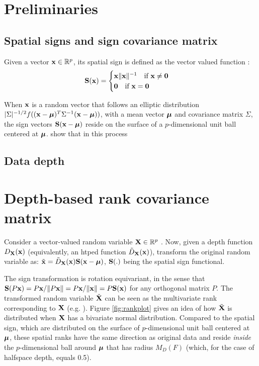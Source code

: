 \documentclass[fleqn,12pt]{article}
\begin{document}
\section{Preliminaries}
\subsection{Spatial signs and sign covariance matrix}
Given a vector ${\bf{x}} \in \mathbb{R}^p$, its spatial sign is defined as the vector valued function \citep{locantore99}:
$$ {\mathbf{S}}({\bf{x}}) = \begin{cases} {\bf{x}}\| {\bf{x}} \|^{-1} \quad \mbox{if }{\bf{x}} \neq \bf0\\
\bf0 \quad \mbox{if }{\bf{x}} = \bf0 \end{cases} $$

When ${\bf{x}}$ is a random vector that follows an elliptic distribution $|\Sigma|^{-1/2} f(({\bf{x}} - {\boldsymbol{\mu}})^T \Sigma^{-1} ({\bf{x}} - {\boldsymbol{\mu}}))$, with a mean vector ${\boldsymbol{\mu}}$ and covariance matrix $\Sigma$, the sign vectors ${\mathbf{S}}({\bf{x}} - {\boldsymbol{\mu}})$ reside on the surface of a $p$-dimensional unit ball centered at ${\boldsymbol{\mu}}$. \cite{taskinen12} show that in this process

\subsection{Data depth}

\section{Depth-based rank covariance matrix}

Consider a vector-valued random variable ${\mathbf{X}} \in \mathbb{R}^p$ . Now, given a depth function $D_{{\mathbf{X}}}({\bf{x}})$ (equivalently, an htped function $\tilde D_{\mathbf{X}}({\bf{x}})$), transform the original random variable as: $\tilde {{\bf{x}}} = \tilde D_{\mathbf{X}}({\bf{x}}) {\mathbf{S}}({\bf{x}} - {\boldsymbol{\mu}})$, ${\mathbf{S}}(.)$ being the spatial sign functional.

The sign transformation is rotation equivariant, in the sense that $ {\mathbf{S}}(P {\bf{x}}) = P{\bf{x}}/\| P {\bf{x}} \| = P{\bf{x}}/\| {\bf{x}} \| = P {\mathbf{S}}({\bf{x}})$ for any orthogonal matrix $P$. The transformed random variable $\tilde {{\mathbf{X}}}$ can be seen as the multivariate rank corresponding to ${\mathbf{X}}$ (e.g. \cite{serfling2006}). Figure \ref{fig:rankplot} gives an idea of how $\tilde {{\mathbf{X}}}$ is distributed when ${\mathbf{X}}$ has a bivariate normal distribution. Compared to the spatial sign, which are distributed on the surface of $p$-dimensional unit ball centered at ${\boldsymbol{\mu}}$, these spatial ranks have the same direction as original data and reside \textit{inside} the $p$-dimensional ball around ${\boldsymbol{\mu}}$ that has radius $M_D(F)$ (which, for the case of halfspace depth, equals 0.5).
\end{document}

